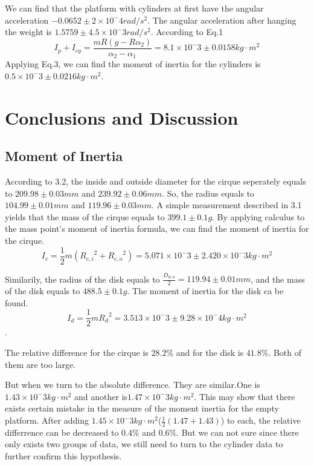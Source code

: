 \documentclass[12pt,a4paper]{article}
\begin{document}
We can find that the platform with cylinders at first have the angular acceleration $-0.0652\pm 2\times 10^-4rad/s^2$. The angular acceleration after hanging the weight is $1.5759\pm 4.5\times 10^-3rad/s^2$. According to Eq.1 $$I_p+I_{cy}=\frac{mR(g-R\alpha_2)}{\alpha_2-\alpha_1}=8.1 \times 10^-3\pm 0.0158kg\cdot m^2$$ Applying Eq.3, we can find the moment of inertia for the cylinders is $0.5\times 10^-3\pm 0.0216kg\cdot m^2$.


\section{Conclusions and Discussion}

\subsection{Moment of Inertia}
According to 3.2, the inside and outside diameter for the cirque seperately equals to $209.98\pm0.03mm$ and $239.92\pm0.06mm$. So, the radius equals to $104.99\pm0.01mm$ and $119.96\pm0.03mm$. A simple measurement described in 3.1 yields that the mass of the cirque equals to $399.1\pm0.1g$. By applying calculus to the mass point's moment of inertia formula, we can find the moment of inertia for the cirque. $$I_c=\frac{1}{2}m({R_{c,i}}^2+{R_{c,o}}^2)=5.071\times 10^-3\pm 2.420\times 10^-3kg\cdot m^2$$ \par

Similarily, the radius of the disk equals to $\frac{D_{d,n}}{2}=119.94\pm0.01mm$, and the mass of the disk equals to $488.5\pm0.1g$. The moment of inertia for the disk ca be found. $$I_d=\frac{1}{2}m{R_d}^2=3.513\times 10^-3\pm 9.28\times 10^-4 kg\cdot m^2$$. \par

The relative difference for the cirque is $28.2\%$ and for the disk is $41.8\%$. Both of them are too large.\par 

But when we turn to the absolute difference. They are similar.One is $1.43\times 10^-3kg\cdot m^2$ and another is$1.47\times 10^-3kg\cdot m^2$. This may show that there exists certain mistake in the measure of the moment inertia for the empty platform. After adding $1.45\times 10^-3kg\cdot m^2$($\frac{1}{2}(1.47+1.43)$) to each, the relative differrence can be decreased to $0.4\%$ and $0.6\%$. But we can not sure since there only exists two groups of data, we still need to turn to the cylinder data to further confirm this hypothesis.
\end{document}

